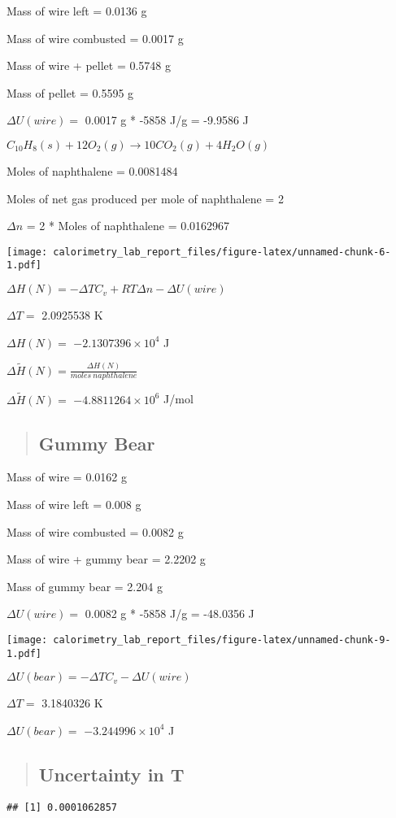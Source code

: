 \documentclass[
]{article}
\begin{document}
Mass of wire left = 0.0136 g

Mass of wire combusted = 0.0017 g

Mass of wire + pellet = 0.5748 g

Mass of pellet = 0.5595 g

\(\Delta U (wire) =\) 0.0017 g * -5858 J/g = -9.9586 J

\(C_{10} H_8(s) + 12O_2 (g) \rightarrow 10CO_2(g) + 4H_2 O(g)\)

Moles of naphthalene = 0.0081484

Moles of net gas produced per mole of naphthalene = 2

\(\Delta n\) = 2 * Moles of naphthalene = 0.0162967

\texttt{[image: calorimetry\_lab\_report\_files/figure-latex/unnamed-chunk-6-1.pdf]}

\(\Delta H(N) = -\Delta TC_v + RT\Delta n - \Delta U (wire)\)

\(\Delta T=\) 2.0925538 K

\(\Delta H(N)=\) \ensuremath{-2.1307396\times 10^{4}} J

\(\Delta \tilde H (N) = \frac {\Delta H(N)}{moles\ naphthalene}\)

\(\Delta \tilde H (N)=\) \ensuremath{-4.8811264\times 10^{6}} J/mol

\newpage

\begin{quote}
\hypertarget{gummy-bear}{%
\subsection{Gummy Bear}\label{gummy-bear}}
\end{quote}

Mass of wire = 0.0162 g

Mass of wire left = 0.008 g

Mass of wire combusted = 0.0082 g

Mass of wire + gummy bear = 2.2202 g

Mass of gummy bear = 2.204 g

\(\Delta U (wire) =\) 0.0082 g * -5858 J/g = -48.0356 J

\texttt{[image: calorimetry\_lab\_report\_files/figure-latex/unnamed-chunk-9-1.pdf]}

\(\Delta U(bear) = -\Delta TC_v - \Delta U (wire)\)

\(\Delta T=\) 3.1840326 K

\(\Delta U(bear)=\) \ensuremath{-3.244996\times 10^{4}} J

\begin{quote}
\hypertarget{uncertainty-in-t}{%
\subsection{Uncertainty in T}\label{uncertainty-in-t}}
\end{quote}

\begin{verbatim}
## [1] 0.0001062857
\end{verbatim}
\end{document}
